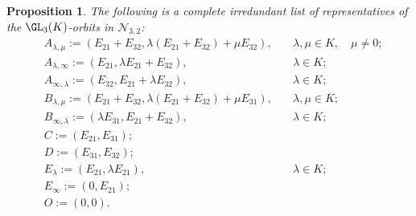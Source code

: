 \documentclass[12pt]{amsart}
\newtheorem{proposition}[theorem]{\bf Proposition}
\newcommand{\field}{K}
\begin{document}
\begin{proposition}\label{prop:list of 3x3 nilpotent orbits}
The following is a complete irredundant list of representatives of the $\GL_3(\field)$-orbits in 
$\mathcal{N}_{3,2}$: 
\begin{align*}
&A_{\lambda,\mu}:=(E_{21}+E_{32},\lambda(E_{21}+E_{32})+\mu E_{32}), \quad &\lambda,\mu\in \field,\quad \mu\neq 0;\\ 
&A_{\lambda,\infty}:=(E_{21},\lambda E_{21}+E_{32}),\quad &\lambda \in \field ; \\ 
&A_{\infty,\lambda}:=(E_{32},E_{21}+\lambda E_{32}),\quad &\lambda\in \field ; \\ 
&B_{\lambda,\mu}:=(E_{21}+E_{32}, \lambda(E_{21}+E_{32})+\mu E_{31}), \quad &\lambda,\mu\in \field ; \\ 
&B_{\infty,\lambda}:=(\lambda E_{31}, E_{21}+E_{32}),\quad &\lambda\in \field; \\ 
&C:=(E_{21},E_{31}); & \\
&D:=(E_{31},E_{32}); & \\ 
&E_{\lambda}:=(E_{21},\lambda E_{21}), \quad &\lambda\in \field; \\ 
&E_{\infty}:=(0,E_{21}); & \\ 
&O:=(0,0). & 
\end{align*}
\end{proposition}
\end{document}
